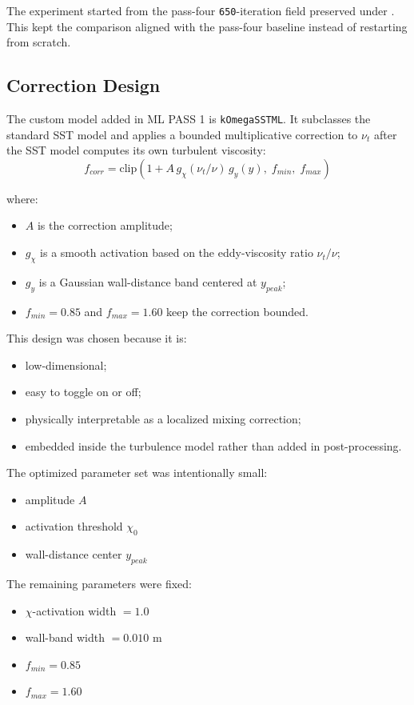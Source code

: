 \documentclass[11pt]{article}
\begin{document}
The experiment started from the pass-four \texttt{650}-iteration field preserved under . This kept the comparison aligned with the pass-four baseline instead of restarting from scratch.

\subsection{Correction Design}
The custom model added in ML PASS 1 is \texttt{kOmegaSSTML}. It subclasses the standard SST model and applies a bounded multiplicative correction to \(\nu_t\) after the SST model computes its own turbulent viscosity:
\[
f_{corr}
=
\mathrm{clip}\left(1 + A \, g_{\chi}(\nu_t/\nu) \, g_y(y),\; f_{min},\; f_{max}\right)
\]

where:
\begin{itemize}
\item \(A\) is the correction amplitude;
\item \(g_{\chi}\) is a smooth activation based on the eddy-viscosity ratio \(\nu_t/\nu\);
\item \(g_y\) is a Gaussian wall-distance band centered at \(y_{peak}\);
\item \(f_{min}=0.85\) and \(f_{max}=1.60\) keep the correction bounded.
\end{itemize}

This design was chosen because it is:
\begin{itemize}
\item low-dimensional;
\item easy to toggle on or off;
\item physically interpretable as a localized mixing correction;
\item embedded inside the turbulence model rather than added in post-processing.
\end{itemize}

The optimized parameter set was intentionally small:
\begin{itemize}
\item amplitude \(A\)
\item activation threshold \(\chi_0\)
\item wall-distance center \(y_{peak}\)
\end{itemize}

The remaining parameters were fixed:
\begin{itemize}
\item \(\chi\)-activation width \(= 1.0\)
\item wall-band width \(= 0.010\) m
\item \(f_{min}=0.85\)
\item \(f_{max}=1.60\)
\end{itemize}
\end{document}
